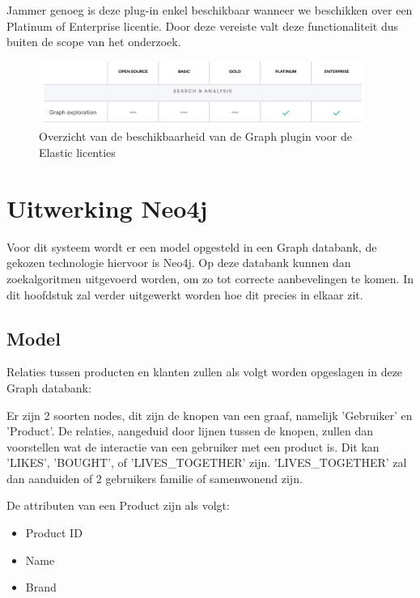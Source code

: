 Jammer genoeg is deze plug-in enkel beschikbaar wanneer we beschikken over een Platinum of Enterprise licentie. Door deze vereiste valt deze functionaliteit dus buiten de scope van het onderzoek. 

\begin{figure} [ht]
	\centering
	\includegraphics[width=0.95\textwidth]{img/elastic-license}
	\caption{Overzicht van de beschikbaarheid van de Graph plugin voor de Elastic licenties}
	\label{fig:elastic licenties overzicht graph}
\end{figure}

\newpage
\section{Uitwerking Neo4j}
\label{sec:UItwerking Neo4j}

Voor dit systeem wordt er een model opgesteld in een Graph databank, de gekozen technologie hiervoor is Neo4j. Op deze databank kunnen dan zoekalgoritmen uitgevoerd worden, om zo tot correcte aanbevelingen te komen. In dit hoofdstuk zal verder uitgewerkt worden hoe dit precies in elkaar zit.

\subsection{Model}
\label{sec:Model}
Relaties tussen producten en klanten zullen als volgt worden opgeslagen in deze Graph databank:

Er zijn 2 soorten nodes, dit zijn de knopen van een graaf, namelijk 'Gebruiker' en 'Product'. De relaties, aangeduid door lijnen tussen de knopen, zullen dan voorstellen wat de interactie van een gebruiker met een product is. Dit kan 'LIKES', 'BOUGHT', of 'LIVES\_TOGETHER' zijn. 'LIVES\_TOGETHER' zal dan aanduiden of 2 gebruikers familie of samenwonend zijn. 

De attributen van een Product zijn als volgt:
\begin{itemize}
	\item Product ID
	\item Name
	\item Brand
\end{itemize}

